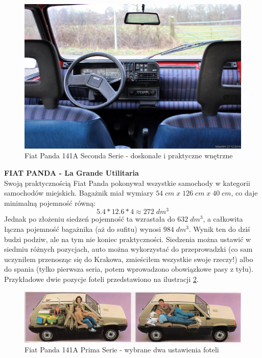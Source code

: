\begin{figure}[H]
\includegraphics[scale=0.35]{pictures/dud/pic2.jpg}
\centering
\caption{Fiat Panda 141A Seconda Serie - doskonałe i praktyczne wnętrzne}
\label{fig:Panda_interni}
\end{figure}
\newpage
\textbf{FIAT PANDA - La Grande Utilitaria}\\
Swoją praktycznością Fiat Panda pokonywał wszystkie samochody w kategorii samochodów miejskich. Bagażnik miał wymiary \(54\;cm\;x\;126\;cm\;x\;40\;cm\), co daje minimalną pojemność równą: \[5.4 * 12.6 * 4 \approx 272\;dm^3\]
Jednak po złożeniu siedzeń pojemność ta wzrastała do \(632\;dm^3\), a całkowita łączna pojemność bagażnika (aż do sufitu) wynosi \(984\;dm^3\). Wynik ten do dziś budzi podziw, ale na tym nie koniec praktyczności. Siedzenia można ustawić w siedmiu różnych pozycjach, auto można wykorzystać do przeprowadzki (co sam uczyniłem przenosząc się do Krakowa, zmieściłem wszystkie swoje rzeczy!) albo do spania (tylko pierwsza seria, potem wprowadzono obowiązkowe pasy z tyłu). Przykładowe dwie pozycje foteli przedstawiono na ilustracji \ref{fig:Panda_sedile_posteriore}.

\begin{figure}[H]
\includegraphics[scale=0.25]{pictures/dud/pic3.jpg}
\centering
\caption{Fiat Panda 141A Prima Serie - wybrane dwa ustawienia foteli}
\label{fig:Panda_sedile_posteriore}
\end{figure}
